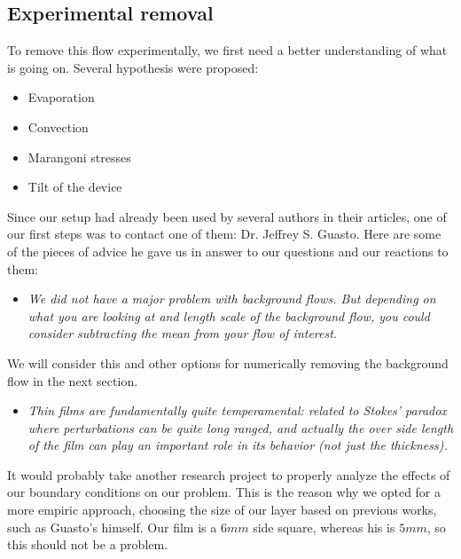 \subsection{Experimental removal}

To remove this flow experimentally, we first need a better understanding of what is going on. Several hypothesis were proposed:

\begin{itemize}
	\item Evaporation
	\item Convection
	\item Marangoni stresses
	\item Tilt of the device
\end{itemize}

Since our setup had already been used by several authors in their articles, one of our first steps was to contact one of them: Dr. Jeffrey S. Guasto. Here are some of the pieces of advice he gave us in answer to our questions and our reactions to them:

\begin{itemize}
	\item \textit{We did not have a major problem with background flows. But depending on what you are looking at and length scale of the background flow, you could consider subtracting the mean from your flow of interest.}
\end{itemize}

We will consider this and other options for numerically removing the background flow in the next section.

\begin{itemize}
	\item \textit{Thin films are fundamentally quite temperamental: related to Stokes' paradox where perturbations can be quite long ranged, and actually the over side length of the film can play an important role in its behavior (not just the thickness).}
\end{itemize}

It would probably take another research project to properly analyze the effects of our boundary conditions on our problem. This is the reason why we opted for a more empiric approach, choosing the size of our layer based on previous works, such as Guasto's himself. Our film is a $6mm$ side square, whereas his is $5mm$, so this should not be a problem.

